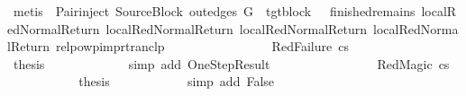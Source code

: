 \begin{isabellebody}
\ {\isacharparenleft}{\kern0pt}metis\ {\isachardoublequoteopen}{}{\isachardoublequoteclose}{\isacharparenleft}{\kern0pt}{}{\isacharparenright}{\kern0pt}\ Pair{\isacharunderscore}{\kern0pt}inject\ SourceBlock\ {\isacartoucheopen}out{\isacharunderscore}{\kern0pt}edges\ G{\isacharprime}{\kern0pt}\ {\isacharbang}{\kern0pt}\ tgt{\isacharunderscore}{\kern0pt}block\ {\isacharequal}{\kern0pt}\ {\isacharbrackleft}{\kern0pt}{\isacharbrackright}{\kern0pt}{\isacartoucheclose}\ finished{\isacharunderscore}{\kern0pt}remains\ local{\isachardot}{\kern0pt}RedNormalReturn{\isacharparenleft}{\kern0pt}{}{\isacharparenright}{\kern0pt}\ local{\isachardot}{\kern0pt}RedNormalReturn{\isacharparenleft}{\kern0pt}{}{\isacharparenright}{\kern0pt}\ local{\isachardot}{\kern0pt}RedNormalReturn{\isacharparenleft}{\kern0pt}{}{\isacharparenright}{\kern0pt}\ local{\isachardot}{\kern0pt}RedNormalReturn{\isacharparenleft}{\kern0pt}{}{\isacharparenright}{\kern0pt}\ relpowp{\isacharunderscore}{\kern0pt}imp{\isacharunderscore}{\kern0pt}rtranclp{\isacharparenright}{\kern0pt}\isanewline
\ \ \ \ \ \ \isamarkupfalse%
\isanewline
\ \ \ \ \ \ \ \ \isamarkupfalse%
\ {\isacharparenleft}{\kern0pt}RedFailure\ cs{\isacharparenright}{\kern0pt}\isanewline
\ \ \ \ \ \ \ \ \isamarkupfalse%
\ \isamarkupfalse%
\ {\isacharquery}{\kern0pt}thesis\ \isanewline
\ \ \ \ \ \ \ \ \ \ \isamarkupfalse%
\ {\isacharparenleft}{\kern0pt}simp\ add{\isacharcolon}{\kern0pt}\ OneStepResult{\isacharparenright}{\kern0pt}\isanewline
\ \ \ \ \ \ \isamarkupfalse%
\isanewline
\ \ \ \ \ \ \ \ \isamarkupfalse%
\ {\isacharparenleft}{\kern0pt}RedMagic\ cs{\isacharparenright}{\kern0pt}\isanewline
\ \ \ \ \ \ \ \ \isamarkupfalse%
\ \isamarkupfalse%
\ {\isacharquery}{\kern0pt}thesis\isanewline
\ \ \ \ \ \ \ \ \ \ \isamarkupfalse%
\ {\isacharparenleft}{\kern0pt}simp\ add{\isacharcolon}{\kern0pt}\ False{\isacharparenright}{\kern0pt}\isanewline
\ \ \ \ \ \ \isamarkupfalse%
\isanewline
\ \ \ \ \isamarkupfalse%
\isanewline
\ \ \isamarkupfalse%
\isanewline
{}\isamarkupfalse%
%
\endisatagproof
{\isafoldproof}%
%
\isadelimproof
%
\endisadelimproof
%
\isadelimdocument
%
\endisadelimdocument
%
\isatagdocument
%
\isamarkuptrue%

\end{isabellebody}
